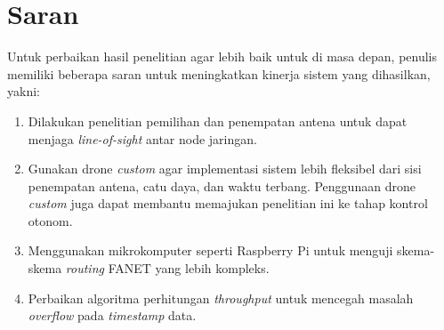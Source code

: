 \section{Saran}
Untuk perbaikan hasil penelitian agar lebih baik untuk di masa depan, penulis memiliki beberapa saran untuk meningkatkan kinerja sistem yang dihasilkan, yakni:
\begin{enumerate}
	\item Dilakukan penelitian pemilihan dan penempatan antena untuk dapat menjaga \textit{line-of-sight} antar node jaringan.
	\item Gunakan drone \textit{custom} agar implementasi sistem lebih fleksibel dari sisi penempatan antena, catu daya, dan waktu terbang. Penggunaan drone \textit{custom} juga dapat membantu memajukan penelitian ini ke tahap kontrol otonom.
	\item Menggunakan mikrokomputer seperti Raspberry Pi untuk menguji skema-skema \textit{routing} FANET yang lebih kompleks.
	\item Perbaikan algoritma perhitungan \textit{throughput} untuk mencegah masalah \textit{overflow} pada \textit{timestamp} data.
\end{enumerate}